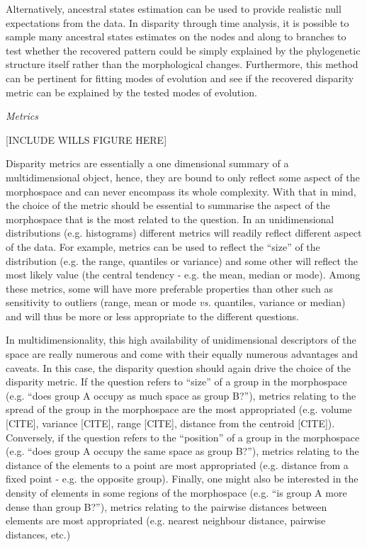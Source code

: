 \documentclass[12pt,letterpaper]{article}
\renewcommand{\subsection}[1]{%
\bigskip
\begin{center}
\begin{large}
\normalfont\itshape #1
\end{large}
\end{center}}
\begin{document}
Alternatively, ancestral states estimation can be used to provide realistic null expectations from the data.
In disparity through time analysis, it is possible to sample many ancestral states estimates on the nodes and along to branches to test whether the recovered pattern could be simply explained by the phylogenetic structure itself rather than the morphological changes.
Furthermore, this method can be pertinent for fitting modes of evolution and see if the recovered disparity metric can be explained by the tested modes of evolution.


\subsection{Metrics}
\label{metrics}
 
[INCLUDE WILLS FIGURE HERE]

Disparity metrics are essentially a one dimensional summary of a multidimensional object, hence, they are bound to only reflect some aspect of the morphospace and can never encompass its whole complexity.
With that in mind, the choice of the metric should be essential to summarise the aspect of the morphospace that is the most related to the question.
In an unidimensional distributions (e.g. histograms) different metrics will readily reflect different aspect of the data.
For example, metrics can be used to reflect the ``size'' of the distribution (e.g. the range, quantiles or variance) and some other will reflect the most likely value (the central tendency - e.g. the mean, median or mode).
Among these metrics, some will have more preferable properties than other such as sensitivity to outliers (range, mean or mode \textit{vs.} quantiles, variance or median) and will thus be more or less appropriate to the different questions.

In multidimensionality, this high availability of unidimensional descriptors of the space are really numerous and come with their equally numerous advantages and caveats.
In this case, the disparity question should again drive the choice of the disparity metric.
If the question refers to ``size'' of a group in the morphospace (e.g. ``does group A occupy as much space as group B?''), metrics relating to the spread of the group in the morphospace are the most appropriated (e.g. volume [CITE], variance [CITE], range [CITE], distance from the centroid [CITE]).
Conversely, if the question refers to the ``position'' of a group in the morphospace (e.g. ``does group A occupy the same space as group B?''), metrics relating to the distance of the elements to a point are most appropriated (e.g. distance from a fixed point - e.g. the opposite group).
Finally, one might also be interested in the density of elements in some regions of the morphospace (e.g. ``is group A more dense than group B?''), metrics relating to the pairwise distances between elements are most appropriated (e.g. nearest neighbour distance, pairwise distances, etc.)
\end{document}
